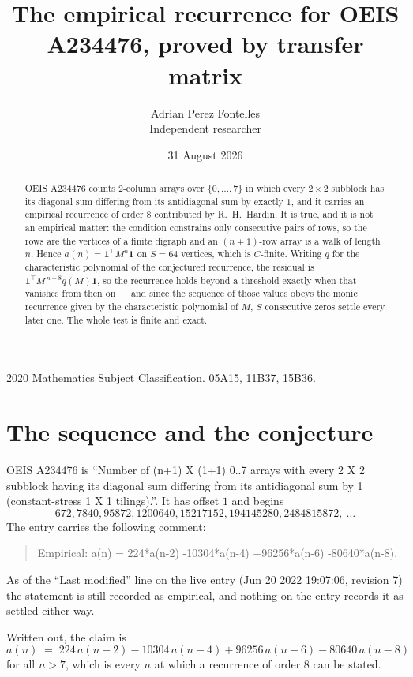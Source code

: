 \documentclass[11pt,a4paper]{article}
\title{The empirical recurrence for OEIS A234476, proved by transfer matrix}
\author{Adrian Perez Fontelles\\ \small Independent researcher}
\date{31 August 2026}
\theoremstyle{plain}
\theoremstyle{definition}
\begin{document}
\maketitle

\begin{abstract}
OEIS A234476 counts $2$-column arrays over $\{0,\dots,7\}$ in which every
$2\times2$ subblock has its diagonal sum differing from its antidiagonal sum by
exactly $1$, and it
carries an empirical recurrence of order $8$ contributed by R.~H.~Hardin. It is true,
and it is not an empirical matter: the condition constrains only consecutive pairs of rows,
so the rows are the vertices of a finite digraph and an $(n+1)$-row array is a walk of
length $n$. Hence $a(n)=\mathbf{1}^{\!\top}M^{n}\mathbf{1}$ on $S=64$ vertices, which
is $C$-finite. Writing $q$ for the characteristic polynomial of the conjectured recurrence,
the residual is $\mathbf{1}^{\!\top}M^{\,n-8}q(M)\mathbf{1}$, so the recurrence
holds beyond a threshold exactly when that vanishes from then on --- and since the sequence
of those values obeys the monic recurrence given by the characteristic polynomial of $M$,
$S$ consecutive zeros settle every later one. The whole test is finite and exact.
\end{abstract}

\noindent\small 2020 Mathematics Subject Classification. 05A15, 11B37, 15B36.\normalsize

\section{The sequence and the conjecture}

OEIS A234476 is ``Number of (n+1) X (1+1) 0..7 arrays with every 2 X 2 subblock having its diagonal sum differing from its antidiagonal sum by 1 (constant-stress 1 X 1 tilings).''. It has offset
$1$ and begins
\[
672, 7840, 95872, 1200640, 15217152, 194145280, 2484815872,\ \dots
\]
The entry carries the following comment:
\begin{quote}\small
Empirical: a(n) = 224*a(n-2) -10304*a(n-4) +96256*a(n-6) -80640*a(n-8).
\end{quote}
As of the ``Last modified'' line on the live entry (Jun 20 2022 19:07:06, revision 7) the statement is
still recorded as empirical, and nothing on the entry records it as settled either way.

Written out, the claim is
\begin{equation}\label{eq:conj}
a(n)\;=\;224\,a(n-2) - 10304\,a(n-4) + 96256\,a(n-6) - 80640\,a(n-8)
\end{equation}
for all $n>7$, which is every $n$ at which a recurrence of order $8$ can be
stated.
\end{document}

